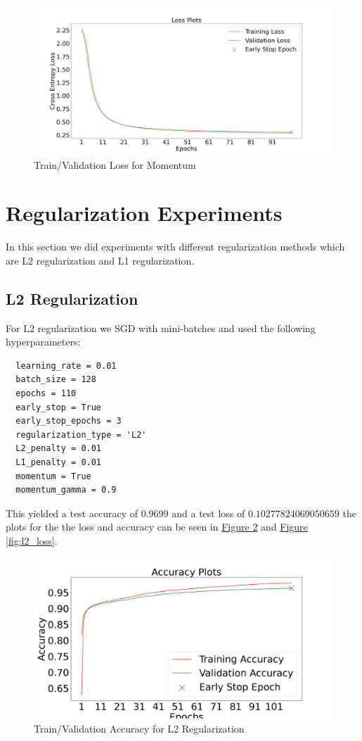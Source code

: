 \documentclass{article}
\begin{document}
\begin{figure}[h]
  \centering
  \includegraphics[width=0.8\linewidth]{include/momentum-experiments-loss-2.png}
  \caption{Train/Validation Loss for Momentum}
  \label{fig:momentum_loss_2}
\end{figure}



\section{Regularization Experiments}
In this section we did experiments with different regularization methods which are 
L2 regularization and L1 regularization. 

\subsection{L2 Regularization}
For L2 regularization we SGD with mini-batches and used the following hyperparameters:
\begin{verbatim}
  learning_rate = 0.01
  batch_size = 128
  epochs = 110
  early_stop = True
  early_stop_epochs = 3
  regularization_type = 'L2'
  L2_penalty = 0.01
  L1_penalty = 0.01
  momentum = True
  momentum_gamma = 0.9
\end{verbatim}

This yielded a test accuracy of $0.9699$ and a test loss of 
$0.10277824069050659$ the plots for the the loss and accuracy can be seen in
\hyperref[fig:l2_acc]{Figure \ref{fig:l2_acc}} and
\hyperref[fig:l2_loss]{Figure \ref{fig:l2_loss}}.

\begin{figure}[h]
  \centering
  \includegraphics[width=0.8\linewidth]{include/reg-exp-l2-acc.png}
  \caption{Train/Validation Accuracy for L2 Regularization}
  \label{fig:l2_acc}
\end{figure}
\end{document}
